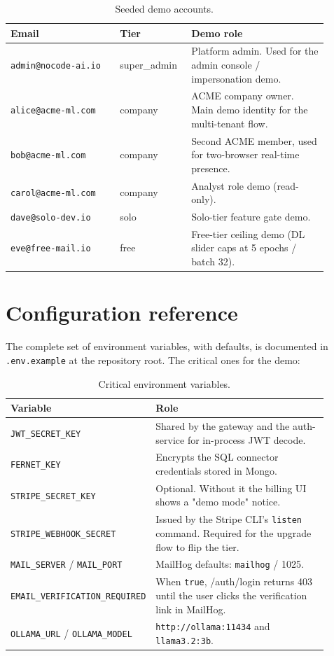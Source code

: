 \documentclass[12pt, a4paper, oneside]{report}
\begin{document}
\begin{table}[H]
\centering
\caption{Seeded demo accounts.}
\label{tab:demo_accounts}
\begin{tabular}{|p{0.32\linewidth}|p{0.18\linewidth}|L{0.40\linewidth}|}
\hline
\textbf{Email} & \textbf{Tier} & \textbf{Demo role} \\ \hline
\texttt{admin@nocode-ai.io} & super\_admin & Platform admin. Used for the admin console / impersonation demo. \\ \hline
\texttt{alice@acme-ml.com} & company & ACME company owner. Main demo identity for the multi-tenant flow. \\ \hline
\texttt{bob@acme-ml.com} & company & Second ACME member, used for two-browser real-time presence. \\ \hline
\texttt{carol@acme-ml.com} & company & Analyst role demo (read-only). \\ \hline
\texttt{dave@solo-dev.io} & solo & Solo-tier feature gate demo. \\ \hline
\texttt{eve@free-mail.io} & free & Free-tier ceiling demo (DL slider caps at 5 epochs / batch 32). \\ \hline
\end{tabular}
\end{table}

\chapter{Configuration reference}
\label{annex:config}

The complete set of environment variables, with defaults, is
documented in \texttt{.env.example} at the repository root. The
critical ones for the demo:

\begin{table}[H]
\centering
\caption{Critical environment variables.}
\label{tab:env_vars}
\begin{tabular}{|p{0.32\linewidth}|L{0.58\linewidth}|}
\hline
\textbf{Variable} & \textbf{Role} \\ \hline
\texttt{JWT\_SECRET\_KEY} & Shared by the gateway and the auth-service for in-process JWT decode. \\ \hline
\texttt{FERNET\_KEY} & Encrypts the SQL connector credentials stored in Mongo. \\ \hline
\texttt{STRIPE\_SECRET\_KEY} & Optional. Without it the billing UI shows a "demo mode" notice. \\ \hline
\texttt{STRIPE\_WEBHOOK\_SECRET} & Issued by the Stripe CLI's \texttt{listen} command. Required for the upgrade flow to flip the tier. \\ \hline
\texttt{MAIL\_SERVER} / \texttt{MAIL\_PORT} & MailHog defaults: \texttt{mailhog} / 1025. \\ \hline
\texttt{EMAIL\_VERIFICATION\_REQUIRED} & When \texttt{true}, /auth/login returns 403 until the user clicks the verification link in MailHog. \\ \hline
\texttt{OLLAMA\_URL} / \texttt{OLLAMA\_MODEL} & \texttt{http://ollama:11434} and \texttt{llama3.2:3b}. \\ \hline
\end{tabular}
\end{table}
\end{document}
